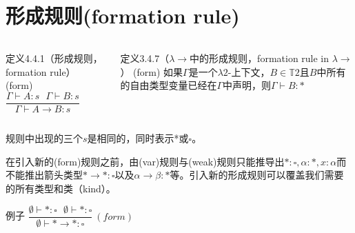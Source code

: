 \documentclass[UTF8,aspectratio=169,mathserif]{beamer}
\begin{document}
	\section{形成规则(formation rule)}
		\begin{frame}
			\begin{columns}
				\begin{column}{0.48\textwidth}
					\begin{exampleblock}{定义4.4.1（形成规则，formation rule）}
						(form)\ $\dfrac{\Gamma\vdash A:s\ \ \ \Gamma\vdash B:s}{\Gamma\vdash A\rightarrow B:s}$
					\end{exampleblock}
				\end{column}
				\begin{column}{0.48\textwidth}
					\begin{block}{定义3.4.7（$\lambda{\rightarrow}$中的形成规则，formation rule in $\lambda{\rightarrow}$）}
						(form) 如果$\Gamma$是一个$\lambda{2}$-上下文，$B\in\mathbb{T}2$且$B$中所有的自由类型变量已经在$\Gamma$中声明，则$\Gamma\vdash B:*$
					\end{block}
				\end{column}
			\end{columns}
			
			规则中出现的三个$s$是相同的，同时表示*或$\square$。
			
			在引入新的(form)规则之前，由(var)规则与(weak)规则只能推导出$*:\square,\alpha:*,x:\alpha$而不能推出箭头类型$*\rightarrow*:\square$以及$\alpha\rightarrow\beta:*$等。引入新的形成规则可以覆盖我们需要的所有类型和类（kind）。
			
			\begin{block}{例子}
				$\dfrac{\emptyset\vdash*:\square\ \ \ \emptyset\vdash*:\square}{\emptyset\vdash*\rightarrow*:\square}\ (form)$
			\end{block}
			
		\end{frame}
\end{document}
